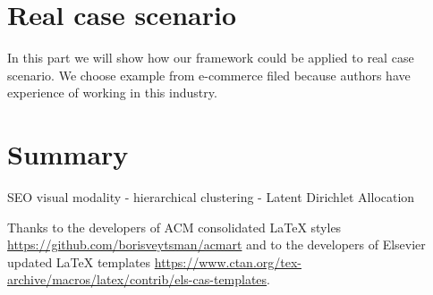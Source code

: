 \documentclass[
]{ceurart}
\begin{document}
\section{Real case scenario}
In this part we will show how our framework could be applied to real case scenario.
We choose example from e-commerce filed because authors have experience of working in this industry.



\section{Summary}
SEO
visual modality
- hierarchical clustering
- Latent Dirichlet Allocation

\begin{acknowledgments}
  Thanks to the developers of ACM consolidated LaTeX styles
  \url{https://github.com/borisveytsman/acmart} and to the developers
  of Elsevier updated \LaTeX{} templates
  \url{https://www.ctan.org/tex-archive/macros/latex/contrib/els-cas-templates}.  
\end{acknowledgments}


\end{document}
